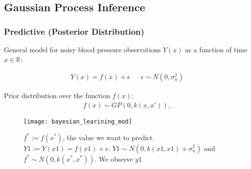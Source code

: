 \documentclass[
	8pt, %
]{beamer}
\begin{document}
\subsection{Gaussian Process Inference}

\begin{frame}
	\frametitle{Predictive (Posterior Distribution)}

	General model for noisy blood pressure observations $Y(x)$ as a function of time $x \in \mathbb{R}$:

	\begin{align*}
		Y(x) = f(x) + \epsilon && \epsilon \sim N(0, \sigma_n^{2})
	\end{align*}


	\smallskip

	Prior distribution over the function $f(x)$:
	\begin{gather*}
		f(x) \sim GP(0, k(x, x')),
	\end{gather*}

	\smallskip

	\begin{figure}
			\texttt{[image: bayesian\_learining\_mod]}
			\caption{$f^{\ast} := f(x^\ast)$, the value we want to predict.
				$Y1 := Y(x1) = f(x1) + \epsilon$. $Y1 \sim N(0, k(x1,x1) + \sigma_n^2)$ and
				$f^{\ast} \sim N(0, k(x^{\ast}, x^{\ast}))$.
				We observe $y1$}
	\end{figure}

\end{frame}
\end{document}
